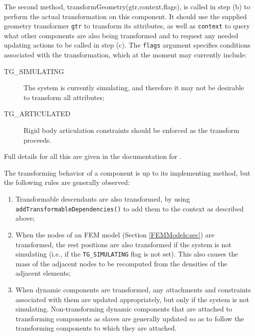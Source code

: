 The second method, 
%
{transformGeometry(gtr,context,flags)}, is
called in step (b) to perform the actual transformation on this
component.  It should use the supplied geometry transformer {\tt gtr}
to transform its attributes, as well as {\tt context} to query what
other components are also being transformed and to request
any needed updating actions to be called in step (c).  The {\tt flags} argument
specifies conditions associated with the transformation, which at the
moment may currently include:

\begin{description}

\item[TG\_SIMULATING]\mbox{}

The system is currently simulating, and therefore it may not be
desirable to transform all attributes;

\item[TG\_ARTICULATED]\mbox{}

Rigid body articulation constraints should
be enforced as the transform proceeds.

\end{description}

Full details for all this are given in the documentation for
.

The transforming behavior of a component is up to its implementing
method, but the following rules are generally observed:

\begin{enumerate}

\item Transformable descendants are also transformed, by using {\tt
addTransformableDependencies()} to add them to the context as described
above;

\item When the nodes of an FEM model (Section \ref{FEMModels:sec}) are
transformed, the rest positions are also transformed if the system is
not simulating (i.e., if the {\tt TG\_SIMULATING} flag is not set).
This also causes the mass of the adjacent nodes to be recomputed from
the densities of the adjacent elements;

\item When dynamic components are transformed, any attachments and
constraints associated with them are updated appropriately, but only
if the system is not simulating. Non-transforming dynamic components
that are attached to transforming components as slaves are generally
updated so as to follow the transforming components to which they are
attached.

\end{enumerate}

